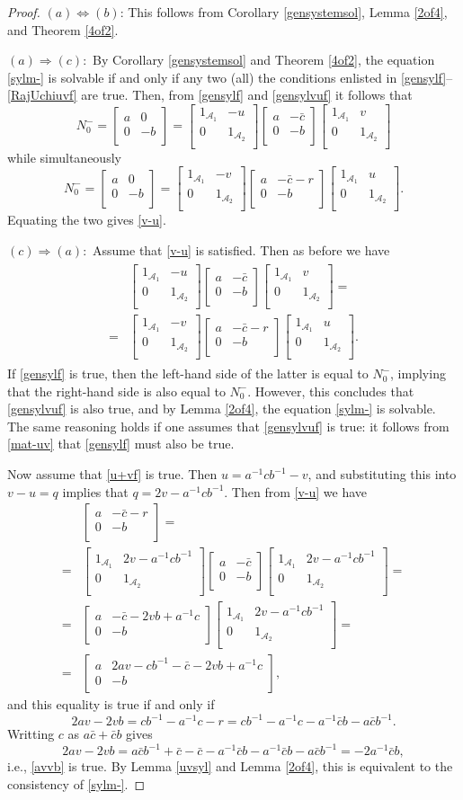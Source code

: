 \documentclass{article}
\theoremstyle{definition}
\def\A{{\mathcal{A}}}
\newcommand{\mat}[4]{\left[\begin{array}{cc}#1 & #2 \\ #3 & #4 \\
	\end{array}\right]}
\begin{document}
\begin{proof} $(a)\Longleftrightarrow(b)$: This follows from Corollary \ref{gensystemsol}, Lemma \ref{2of4}, and Theorem \ref{4of2}.


$(a)\Rightarrow(c):$ By  Corollary \ref{gensystemsol} and Theorem \ref{4of2}, the equation \eqref{sylm-} is solvable if and only if any two (all) the conditions enlisted in \eqref{gensylf}--\eqref{RajUchiuvf} are true. Then, from  \eqref{gensylf} and \eqref{gensylvuf} it follows that
$$N_0^-=\mat{a}{0}{0}{-b}=\mat{1_{\A_1}}{-u}{0}{1_{\A_2}}\mat{a}{-\bar{c}}{0}{-b}\mat{1_{\A_1}}{v}{0}{1_{\A_2}}$$
while simultaneously
$$N_0^-=\mat{a}{0}{0}{-b}=\mat{1_{\A_1}}{-v}{0}{1_{\A_2}}\mat{a}{-\bar{c}-r}{0}{-b}\mat{1_{\A_1}}{u}{0}{1_{\A_2}}.$$
Equating the two gives \eqref{v-u}. 

$(c)\Rightarrow(a):$ Assume that \eqref{v-u} is satisfied. Then as before we have
\begin{eqnarray}\label{mat-uv}
\begin{aligned}
&\mat{1_{\A_1}}{-u}{0}{1_{\A_2}}\mat{a}{-\bar{c}}{0}{-b}\mat{1_{\A_1}}{v}{0}{1_{\A_2}}=\\
=&\mat{1_{\A_1}}{-v}{0}{1_{\A_2}}\mat{a}{-\bar{c}-r}{0}{-b}\mat{1_{\A_1}}{u}{0}{1_{\A_2}}.
\end{aligned}
\end{eqnarray}
If \eqref{gensylf} is true, then the left-hand side of the latter is equal to $N_0^-$, implying that the right-hand side is also equal to $N_0^-$. However, this concludes that \eqref{gensylvuf} is also true, and by Lemma \ref{2of4}, the equation \eqref{sylm-} is solvable. The same reasoning holds if one assumes that \eqref{gensylvuf} is true: it follows from \eqref{mat-uv} that \eqref{gensylf} must also be true. 

Now assume that \eqref{u+vf} is true. Then $u=a^{-1}cb^{-1}-v$, and substituting this into $v-u=q$ implies that $q=2v-a^{-1}cb^{-1}$. Then from \eqref{v-u} we have
$$\begin{aligned}
&\mat{a}{-\bar{c}-r}{0}{-b}=\\
=&\mat{1_{\A_1}}{2v-a^{-1}cb^{-1}}{0}{1_{\A_2}}\mat{a}{-\bar{c}}{0}{-b}\mat{1_{\A_1}}{2v-a^{-1}cb^{-1}}{0}{1_{\A_2}}=\\
=&\mat{a}{-\bar{c}-2vb+a^{-1}c}{0}{-b}\mat{1_{\A_1}}{2v-a^{-1}cb^{-1}}{0}{1_{\A_2}}=\\
=&\mat{a}{2av-cb^{-1}-\bar{c}-2vb+a^{-1}c}{0}{-b},
\end{aligned}$$
and this equality is true if and only if
$$2av-2vb=cb^{-1}-a^{-1}c-r=cb^{-1}-a^{-1}c-a^{-1}\bar{c}b-a\bar{c}b^{-1}.$$
Writting $c$ as $a\bar{c}+\bar{c}b$ gives
$$2av-2vb=a\bar{c}b^{-1}+\bar{c}-\bar{c}-a^{-1}\bar{c}b-a^{-1}\bar{c}b-a\bar{c}b^{-1}=-2a^{-1}\bar{c}b,$$
i.e., \eqref{avvb} is true. By Lemma \ref{uvsyl} and Lemma \ref{2of4}, this is equivalent to the consistency of \eqref{sylm-}. 


\end{proof}
\end{document}

